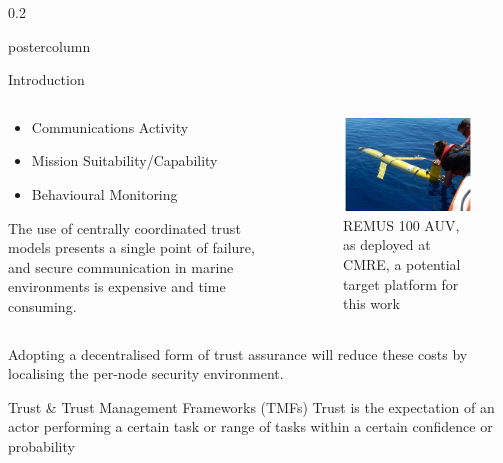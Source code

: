 \documentclass[final,hyperref={pdfpagelabels=false}]{beamer}
\def\colwidth{0.2\linewidth}
\begin{document}
\begin{frame}[fragile]
\begin{columns}[T]
\begin{column}{\colwidth}
\begin{beamercolorbox}[center,wd=\textwidth]{postercolumn}
\begin{minipage}[T]{.99\textwidth}
{\begin{block}{Introduction}
							\begin{columns}[T]
								\begin{column}{0.416\textwidth}
									
									\begin{itemize}
										\item Communications Activity
										\item Mission Suitability/Capability
										\item Behavioural Monitoring
									\end{itemize}
									
									The use of centrally coordinated trust models presents a single point of failure, and secure communication in marine environments is expensive and time consuming. 
									
								\end{column}
								\begin{column}{0.416\textwidth}
									\begin{figure}[h]
										\centering
										\includegraphics[width=0.8\linewidth]{remus100cmre}
										\vspace{1ex}
										\caption{REMUS 100 AUV, as deployed at CMRE, a potential target platform for this work}
									\end{figure}
								\end{column}
							\end{columns}
							\vspace{0.25\baselineskip}
							Adopting a decentralised form of trust assurance will reduce these costs by localising the per-node security environment.
						\end{block}
						\begin{block}{Trust \& Trust Management Frameworks (TMFs)}
							Trust is the expectation of an actor performing a certain task or range of tasks within a certain confidence or probability
														

\end{block}}
\end{minipage}
\end{beamercolorbox}
\end{column}
\end{columns}
\end{frame}
\end{document}
